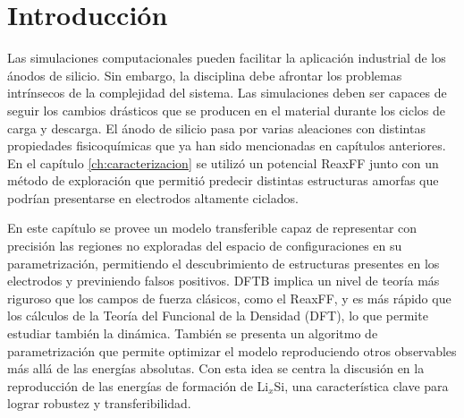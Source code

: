 \section{Introducción}

Las simulaciones computacionales pueden facilitar la aplicación industrial de los
ánodos de silicio. Sin embargo, la disciplina debe afrontar los problemas 
intrínsecos de la complejidad del sistema. Las simulaciones deben ser capaces
de seguir los cambios drásticos que se producen en el material durante los ciclos
de carga y descarga. El ánodo de silicio pasa por varias aleaciones con distintas
propiedades fisicoquímicas que ya han sido mencionadas en capítulos anteriores.
En el capítulo \ref{ch:caracterizacion} se utilizó un potencial ReaxFF 
\cite{fan2013} junto con un método de exploración que permitió predecir distintas
estructuras amorfas que podrían presentarse en electrodos altamente ciclados.

En este capítulo se provee un modelo transferible capaz de representar con 
precisión las regiones no exploradas del espacio de configuraciones en su 
parametrización, permitiendo el descubrimiento de estructuras presentes en los
electrodos y previniendo falsos positivos. DFTB implica un nivel de teoría
más riguroso que los campos de fuerza clásicos, como el ReaxFF, y es más rápido que
los cálculos de la Teoría del Funcional de la Densidad (DFT), lo que permite 
estudiar también la dinámica. También se presenta un algoritmo de parametrización
que permite optimizar el modelo reproduciendo otros observables más allá de las
energías absolutas. Con esta idea se centra la discusión en la reproducción de las
energías de formación de Li$_x$Si, una característica clave para lograr robustez
y transferibilidad. 
